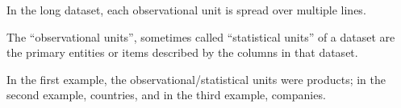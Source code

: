 \documentclass[
  letterpaper,
  DIV=11,
  numbers=noendperiod]{scrreprt}
\begin{document}
In the long dataset, each observational unit is spread over multiple
lines.

\begin{tcolorbox}[enhanced jigsaw, colframe=quarto-callout-note-color-frame, opacityback=0, titlerule=0mm, bottomrule=.15mm, breakable, leftrule=.75mm, colbacktitle=quarto-callout-note-color!10!white, title=\textcolor{quarto-callout-note-color}{\faInfo}\hspace{0.5em}{Vocab}, rightrule=.15mm, coltitle=black, opacitybacktitle=0.6, colback=white, left=2mm, arc=.35mm, toptitle=1mm, bottomtitle=1mm, toprule=.15mm]

The ``observational units'', sometimes called ``statistical units'' of a
dataset are the primary entities or items described by the columns in
that dataset.

In the first example, the observational/statistical units were products;
in the second example, countries, and in the third example, companies.

\end{tcolorbox}
\end{document}
